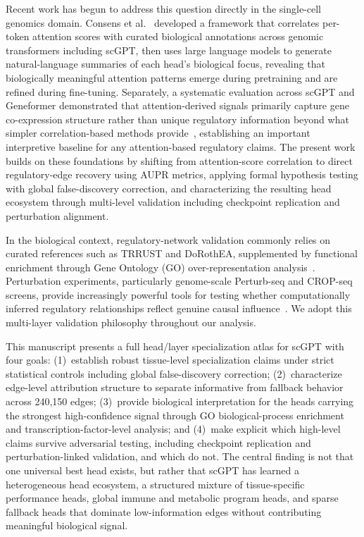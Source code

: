 \documentclass[11pt]{article}
\begin{document}
Recent work has begun to address this question directly in the single-cell genomics domain. Consens et al.~\cite{consens2025attention} developed a framework that correlates per-token attention scores with curated biological annotations across genomic transformers including scGPT, then uses large language models to generate natural-language summaries of each head's biological focus, revealing that biologically meaningful attention patterns emerge during pretraining and are refined during fine-tuning. Separately, a systematic evaluation across scGPT and Geneformer demonstrated that attention-derived signals primarily capture gene co-expression structure rather than unique regulatory information beyond what simpler correlation-based methods provide~\cite{kendiukhov2026coexpression}, establishing an important interpretive baseline for any attention-based regulatory claims. The present work builds on these foundations by shifting from attention-score correlation to direct regulatory-edge recovery using AUPR metrics, applying formal hypothesis testing with global false-discovery correction, and characterizing the resulting head ecosystem through multi-level validation including checkpoint replication and perturbation alignment.

In the biological context, regulatory-network validation commonly relies on curated references such as TRRUST and DoRothEA, supplemented by functional enrichment through Gene Ontology (GO) over-representation analysis~\cite{han2018trrust,garcia2019dorothea,ashburner2000go,kolberg2020gprofiler2}. Perturbation experiments, particularly genome-scale Perturb-seq and CROP-seq screens, provide increasingly powerful tools for testing whether computationally inferred regulatory relationships reflect genuine causal influence~\cite{dixit2016perturb,datlinger2017cropseq,replogle2022perturbseq,adamson2016multiplexed}. We adopt this multi-layer validation philosophy throughout our analysis.

This manuscript presents a full head/layer specialization atlas for scGPT with four goals: (1)~establish robust tissue-level specialization claims under strict statistical controls including global false-discovery correction; (2)~characterize edge-level attribution structure to separate informative from fallback behavior across 240,150 edges; (3)~provide biological interpretation for the heads carrying the strongest high-confidence signal through GO biological-process enrichment and transcription-factor-level analysis; and (4)~make explicit which high-level claims survive adversarial testing, including checkpoint replication and perturbation-linked validation, and which do not. The central finding is not that one universal best head exists, but rather that scGPT has learned a heterogeneous head ecosystem, a structured mixture of tissue-specific performance heads, global immune and metabolic program heads, and sparse fallback heads that dominate low-information edges without contributing meaningful biological signal.
\end{document}
